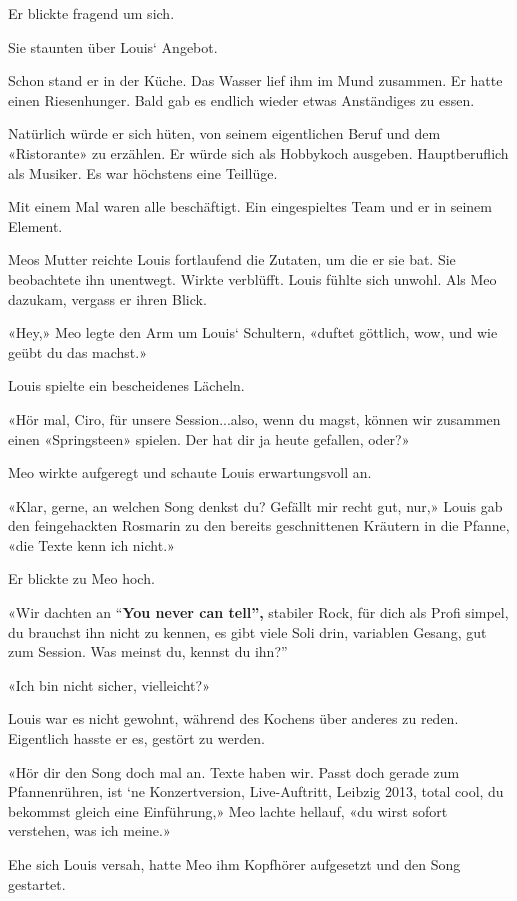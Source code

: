 Er blickte fragend um sich.

Sie staunten über Louis` Angebot.

Schon stand er in der Küche. Das Wasser lief ihm im Mund zusammen. Er
hatte einen Riesenhunger. Bald gab es endlich wieder etwas Anständiges
zu essen.

Natürlich würde er sich hüten, von seinem eigentlichen Beruf und dem
«Ristorante» zu erzählen. Er würde sich als Hobbykoch ausgeben.
Hauptberuflich als Musiker. Es war höchstens eine Teillüge.

Mit einem Mal waren alle beschäftigt. Ein eingespieltes Team und er in
seinem Element.

Meos Mutter reichte Louis fortlaufend die Zutaten, um die er sie bat.
Sie beobachtete ihn unentwegt. Wirkte verblüfft. Louis fühlte sich
unwohl. Als Meo dazukam, vergass er ihren Blick.

«Hey,» Meo legte den Arm um Louis` Schultern, «duftet göttlich, wow, und
wie geübt du das machst.»

Louis spielte ein bescheidenes Lächeln.

«Hör mal, Ciro, für unsere Session...also, wenn du magst, können wir
zusammen einen «Springsteen» spielen. Der hat dir ja heute gefallen,
oder?»

Meo wirkte aufgeregt und schaute Louis erwartungsvoll an.

«Klar, gerne, an welchen Song denkst du? Gefällt mir recht gut, nur,»
Louis gab den feingehackten Rosmarin zu den bereits geschnittenen
Kräutern in die Pfanne, «die Texte kenn ich nicht.»

Er blickte zu Meo hoch.

«Wir dachten an ``\textbf{You never can tell'',} stabiler Rock, für dich
als Profi simpel, du brauchst ihn nicht zu kennen, es gibt viele Soli
drin, variablen Gesang, gut zum Session. Was meinst du, kennst du ihn?''

«Ich bin nicht sicher, vielleicht?»

Louis war es nicht gewohnt, während des Kochens über anderes zu reden.
Eigentlich hasste er es, gestört zu werden.

«Hör dir den Song doch mal an. Texte haben wir. Passt doch gerade zum
Pfannenrühren, ist `ne Konzertversion, Live-Auftritt, Leibzig 2013,
total cool, du bekommst gleich eine Einführung,» Meo lachte hellauf, «du
wirst sofort verstehen, was ich meine.»

Ehe sich Louis versah, hatte Meo ihm Kopfhörer aufgesetzt und den Song
gestartet.

